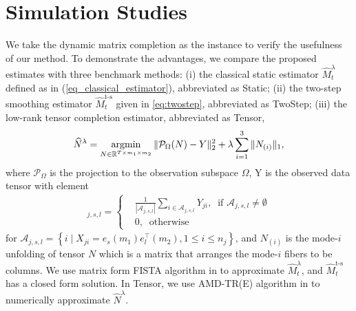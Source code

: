 \documentclass[12pt]{article}
\def\argmin{\mathop{\rm argmin}}
\begin{document}

\section{Simulation Studies}
\label{sec:simu}
  We take the dynamic matrix completion as the instance to verify the usefulness of our method.
  To demonstrate the advantages,  we compare the proposed estimates with three benchmark methods: (i) the classical static estimator $\widehat{M}_t^\lambda$ defined as in (\ref{eq_classical_estimator}), abbreviated as Static; (ii) the two-step smoothing estimator $\widehat{M}_t^{\text{t-s}}$ given in \eqref{eq:twostep}, abbreviated as TwoStep; (iii) the low-rank tensor completion estimator, abbreviated as Tensor,
  \begin{equation*}
  \widehat{N}^\lambda =  \argmin_{N\in \mathbb{R}^{T\times m_1\times m_2}} \|\mathcal{P}_\Omega(N)-Y\|_2^2 + \lambda \sum_{i=1}^3 \|N_{(i)}\|_1,
  \end{equation*}
  where $\mathcal{P}_\Omega$ is the projection to the observation subspace $\Omega$, Y is the observed data tensor with element 
  \begin{align*}[Y]_{j,s,l}=\left\{
		\begin{aligned}
			&\frac{1}{|\mathcal{A}_{j,s,l}|}\sum_{i\in \mathcal{A}_{j,s,l}}Y_{ji},\ \text{ if }  \mathcal{A}_{j,s,l}\neq \emptyset \\
			 &0,\ \text{ otherwise}
		\end{aligned}
		\right.
  \end{align*}
  for $\mathcal{A}_{j,s,l} = \left\{i\mid X_{ji} = e_s(m_1)e^\top_l(m_2),1\le i\le n_j\right\}$, and $N_{(i)}$ is the mode-$i$ unfolding of tensor $N$ which is a matrix that arranges the mode-$i$ fibers to be columns. We use matrix form FISTA algorithm in \cite{toh2010accelerated} to approximate $\widehat{M}_t^\lambda$, and $\widehat{M}^{\text{t-s}}_{t}$ has a closed form solution. In Tensor, we use AMD-TR(E) algorithm in \cite{gandy2011tensor} to numerically approximate $\widehat{N}^\lambda$.
\end{document}
